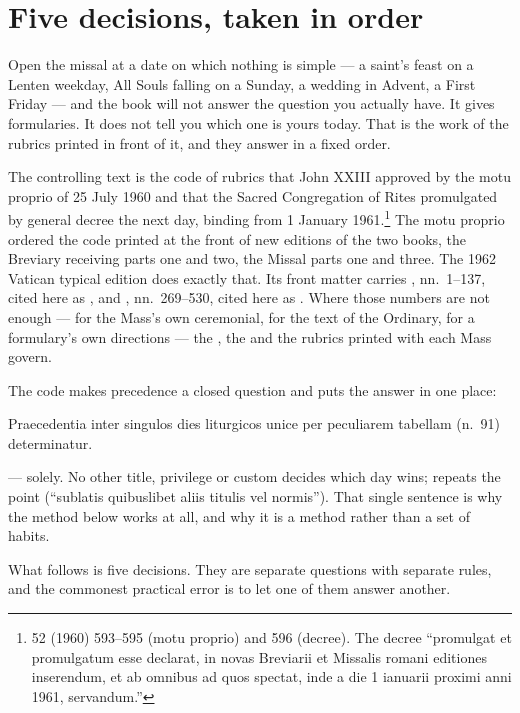 \section{Five decisions, taken in order}

Open the missal at a date on which nothing is simple --- a saint's feast on a
Lenten weekday, All Souls falling on a Sunday, a wedding in Advent, a First
Friday --- and the book will not answer the question you actually have. It
gives formularies. It does not tell you which one is yours today. That is the
work of the rubrics printed in front of it, and they answer in a fixed order.

The controlling text is the code of rubrics that John XXIII approved by the
motu proprio  of 25 July 1960 and that the Sacred
Congregation of Rites promulgated by general decree the next day, binding from
1 January 1961.\footnote{ 52 (1960) 593--595
(motu proprio) and 596 (decree). The decree ``promulgat et promulgatum esse
declarat, in novas Breviarii et Missalis romani editiones inserendum, et ab
omnibus ad quos spectat, inde a die 1 ianuarii proximi anni 1961,
servandum.''} The motu proprio ordered the code printed at the front of new
editions of the two books, the Breviary receiving parts one and two, the
Missal parts one and three. The 1962 Vatican typical edition does exactly
that. Its front matter carries , nn.~1--137, cited
here as , and , nn.~269--530,
cited here as . Where those numbers are not enough --- for the Mass's
own ceremonial, for the text of the Ordinary, for a formulary's own directions
--- the , the 
and the rubrics printed with each Mass govern.

The code makes precedence a closed question and puts the answer in one place:

\begin{rulebox}{}
Praecedentia inter singulos dies liturgicos unice per peculiarem tabellam
(n.~91) determinatur.
\end{rulebox}

\noindent
{} --- solely. No other title, privilege or custom decides which
day wins;  repeats the point (``sublatis quibuslibet aliis titulis vel
normis''). That single sentence is why the method below works at all, and why
it is a method rather than a set of habits.

What follows is five decisions. They are separate questions with separate
rules, and the commonest practical error is to let one of them answer another.


